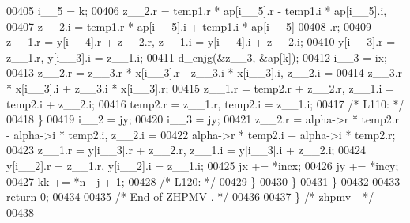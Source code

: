 \begin{DoxyCode}
00405             i\_\_5 = k;
00406             z\_\_2.r = temp1.r * ap[i\_\_5].r - temp1.i * ap[i\_\_5].i, 
00407                 z\_\_2.i = temp1.r * ap[i\_\_5].i + temp1.i * ap[i\_\_5]
00408                 .r;
00409             z\_\_1.r = y[i\_\_4].r + z\_\_2.r, z\_\_1.i = y[i\_\_4].i + z\_\_2.i;
00410             y[i\_\_3].r = z\_\_1.r, y[i\_\_3].i = z\_\_1.i;
00411             d\_cnjg(&z\_\_3, &ap[k]);
00412             i\_\_3 = ix;
00413             z\_\_2.r = z\_\_3.r * x[i\_\_3].r - z\_\_3.i * x[i\_\_3].i, z\_\_2.i =
00414                  z\_\_3.r * x[i\_\_3].i + z\_\_3.i * x[i\_\_3].r;
00415             z\_\_1.r = temp2.r + z\_\_2.r, z\_\_1.i = temp2.i + z\_\_2.i;
00416             temp2.r = z\_\_1.r, temp2.i = z\_\_1.i;
00417 \textcolor{comment}{/* L110: */}
00418         \}
00419         i\_\_2 = jy;
00420         i\_\_3 = jy;
00421         z\_\_2.r = alpha->r * temp2.r - alpha->i * temp2.i, z\_\_2.i = 
00422             alpha->r * temp2.i + alpha->i * temp2.r;
00423         z\_\_1.r = y[i\_\_3].r + z\_\_2.r, z\_\_1.i = y[i\_\_3].i + z\_\_2.i;
00424         y[i\_\_2].r = z\_\_1.r, y[i\_\_2].i = z\_\_1.i;
00425         jx += *incx;
00426         jy += *incy;
00427         kk += *n - j + 1;
00428 \textcolor{comment}{/* L120: */}
00429         \}
00430     \}
00431     \}
00432 
00433     \textcolor{keywordflow}{return} 0;
00434 
00435 \textcolor{comment}{/*     End of ZHPMV . */}
00436 
00437 \} \textcolor{comment}{/* zhpmv\_ */}
00438 
\end{DoxyCode}
